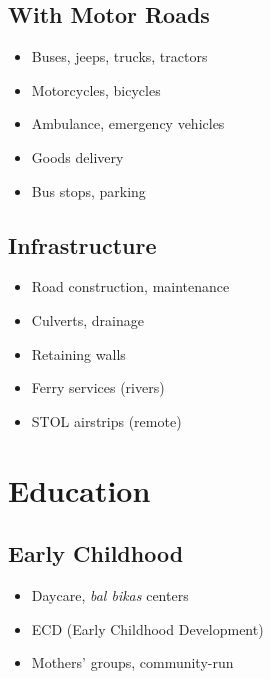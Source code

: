 \documentclass[11pt,a4paper]{article}
\begin{document}
\subsection{With Motor Roads}
\begin{itemize}
    \item Buses, jeeps, trucks, tractors
    \item Motorcycles, bicycles
    \item Ambulance, emergency vehicles
    \item Goods delivery
    \item Bus stops, parking
\end{itemize}

\subsection{Infrastructure}
\begin{itemize}
    \item Road construction, maintenance
    \item Culverts, drainage
    \item Retaining walls
    \item Ferry services (rivers)
    \item STOL airstrips (remote)
\end{itemize}

\section{Education}

\subsection{Early Childhood}
\begin{itemize}
    \item Daycare, \textit{bal bikas} centers
    \item ECD (Early Childhood Development)
    \item Mothers' groups, community-run
\end{itemize}
\end{document}
